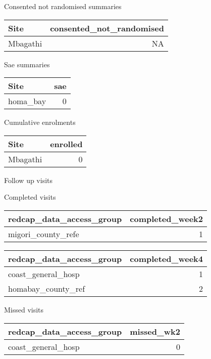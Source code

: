 \documentclass[
]{article}
\begin{document}
Consented not randomised summaries

\begin{table}
\centering
\begin{tabular}[t]{l|r}
\hline
Site & consented\_not\_randomised\\
\hline
Mbagathi & NA\\
\hline
\end{tabular}
\end{table}

Sae summaries

\begin{table}
\centering
\begin{tabular}[t]{l|r}
\hline
Site & sae\\
\hline
homa\_bay & 0\\
\hline
\end{tabular}
\end{table}

Cumulative enrolments

\begin{table}
\centering
\begin{tabular}[t]{l|r}
\hline
Site & enrolled\\
\hline
Mbagathi & 0\\
\hline
\end{tabular}
\end{table}

Follow up visits

Completed visits

\begin{table}
\centering
\begin{tabular}[t]{l|r}
\hline
redcap\_data\_access\_group & completed\_week2\\
\hline
migori\_county\_refe & 1\\
\hline
\end{tabular}
\end{table}

\begin{table}
\centering
\begin{tabular}[t]{l|r}
\hline
redcap\_data\_access\_group & completed\_week4\\
\hline
coast\_general\_hosp & 1\\
\hline
homabay\_county\_ref & 2\\
\hline
\end{tabular}
\end{table}

Missed visits

\begin{table}
\centering
\begin{tabular}[t]{l|r}
\hline
redcap\_data\_access\_group & missed\_wk2\\
\hline
coast\_general\_hosp & 0\\
\hline
\end{tabular}
\end{table}
\end{document}
